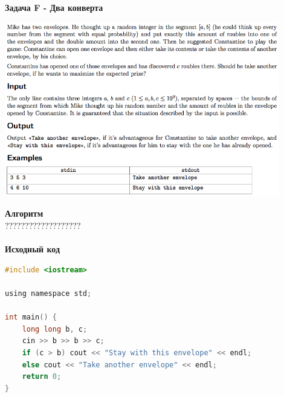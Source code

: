 \documentclass[a4paper,12pt]{article}
\begin{document}
\newpage
\textbf{{\large Задача F - Два конверта}} \\
\begin{center}
\includegraphics[width=0.9\textwidth]{CT_SGAU/CT_SGAU_F.png}\\ [1cm]
\end{center}
\textbf{{\large Алгоритм}} \\
{\Huge ???????????????????} \\ 
\\
\textbf{{\large Исходный код}}
\begin{lstlisting}[language=C]
#include <iostream>

using namespace std;

int main() {
    long long b, c;
    cin >> b >> b >> c;
    if (c > b) cout << "Stay with this envelope" << endl;
    else cout << "Take another envelope" << endl;
    return 0;
}
\end{lstlisting}
\end{document}
